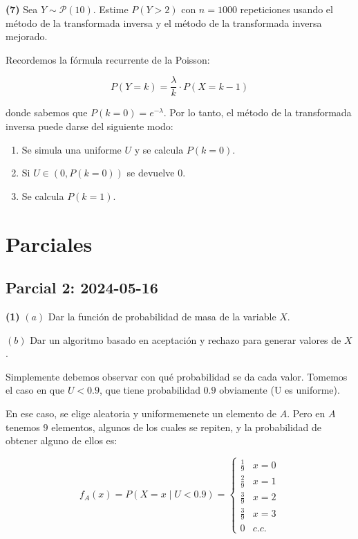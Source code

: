 \documentclass[a4paper, 12pt]{article}
\begin{document}
\begin{myframe}
  \textbf{(7)} Sea $Y \sim \mathcal{P}\left( 10 \right) $. Estime $P(Y > 2)$ con $n = 1000$
  repeticiones usando el método de la transformada inversa y el método de la
  transformada inversa mejorado.
\end{myframe}

Recordemos la fórmula recurrente de la Poisson:

\begin{equation*}
  P(Y = k) = \frac{\lambda}{k} \cdot P(X = k-1)
\end{equation*}

donde sabemos que $P(k = 0) = e^{-\lambda}$. Por lo tanto, el método de la
transformada inversa puede darse del siguiente modo:

\begin{enumerate}
  \item Se simula una uniforme $U$ y se calcula $P(k = 0)$.
  \item Si $U \in (0, P(k = 0))$ se devuelve $0$. 
  \item Se calcula $P(k = 1)$.
\end{enumerate}

\pagebreak 


\section{Parciales}

\subsection{Parcial 2: 2024-05-16}

\begin{myframe}
  \textbf{(1)} $(a)$ Dar la función de probabilidad de masa de la variable $X$. 

  $(b)$ Dar un algoritmo basado en aceptación y rechazo para generar valores de
  $X$.
\end{myframe}

Simplemente debemos observar con qué probabilidad se da cada valor. Tomemos el
caso en que $U < 0.9$, que tiene probabilidad $0.9$ obviamente (U es uniforme).

En ese caso, se elige aleatoria y uniformemenete un elemento de $A$. Pero en $A$
tenemos $9$ elementos, algunos de los cuales se repiten, y la probabilidad de
obtener alguno de ellos es:

\begin{equation*}
  f_A(x) = P(X = x \mid U < 0.9) = \begin{cases}
    \frac{1}{9} & x = 0 \\ 
    \frac{2}{9} & x = 1 \\ 
    \frac{3}{9} & x =2 \\ 
    \frac{3}{9} & x = 3 \\ 
    0 & c.c.
  \end{cases}
\end{equation*}
\end{document}
